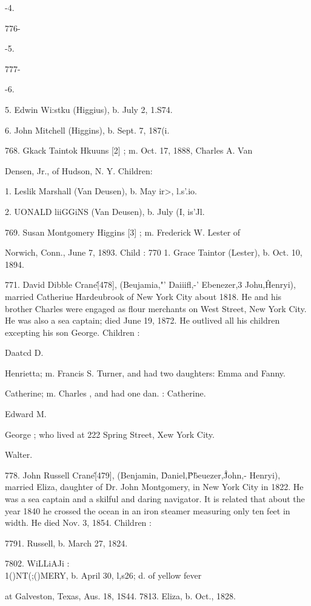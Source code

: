 \documentclass{book}
\begin{document}
-4. 


776- 


-5. 


777- 


-6. 




5. Edwin Wi:stku (Higgius), b. July 2, 1.S74. 

6. John Mitchell (Higgins), b. Sept. 7, 187(i. 

768. Gkack Taintok Hkuuns [2] ; m. Oct. 17, 1888, Charles A. Van 

Densen, Jr., of Hudson, N. Y. Children: 

1. Leslik Marshall (Van Deusen), b. May ir>, l.s'.io. 

2. UONALD liiGGiNS (Van Deusen), b. July (I, is'Jl. 

769. Susan Montgomery Higgins [3] ; m. Frederick W. Lester of 

Norwich, Conn., June 7, 1893. Child : 
770 1. Grace Taintor (Lester), b. Oct. 10, 1894. 

771. David Dibble Crane\^ [478], (Beujamia,"' Daiiifl,-' 
Ebenezer,3 Johu,\^ Henryi), married Catheriue Hardeubrook of 
New York City about 1818. He and his brother Charles were 
engaged as flour merchants on West Street, New York City. He 
was also a sea captain; died June 19, 1872. He outlived all his 
children excepting his son George. Children : 

Daatcd D. 

Henrietta; m. Francis S. Turner, and had two daughters: 
Emma and Fanny. 

Catherine; m. Charles , and had one dan. : Catherine. 

Edward M. 

George ; who lived at 222 Spring Street, Xew York City. 

Walter. 

778. John Russell Crane\^ [479], (Benjamin, \^ Daniel,\^ 
P\^beuezer,\^\^ John,- Henryi), married Eliza, daughter of Dr. John 
Montgomery, in New York City in 1822. He was a sea captain 
and a skilful and daring navigator. It is related that about the 
year 1840 he crossed the ocean in an iron steamer measuring only 
ten feet in width. He died Nov. 3, 1854. Children : 

7791. Russell, b. March 27, 1824. 

7802. WiLLiAJi :\\1()NT(;()MERY, b. April 30, l,s26; d. of yellow fever 

at Galveston, Texas, Aus. 18, 1S44. 
7813. Eliza, b. Oct., 1828. 
\end{document}
